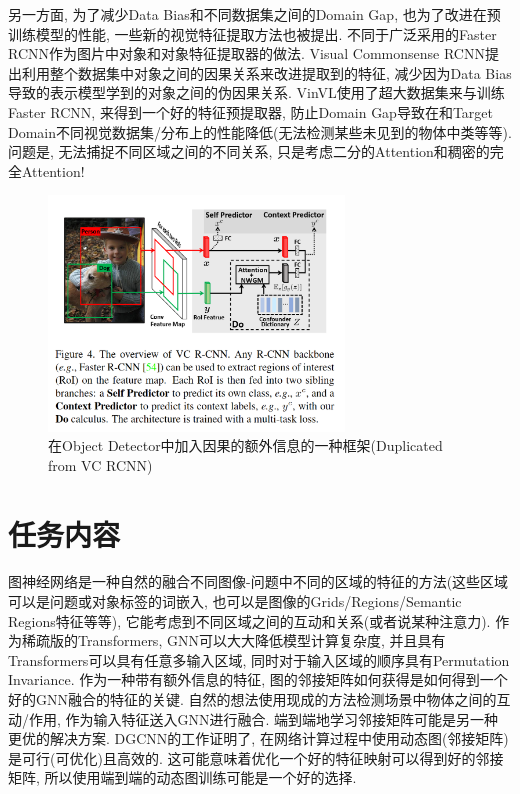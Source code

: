 \documentclass{article}
\begin{document}
另一方面, 为了减少Data Bias和不同数据集之间的Domain Gap, 也为了改进在预训练模型的性能, 一些新的视觉特征提取方法也被提出. 不同于广泛采用的Faster RCNN作为图片中对象和对象特征提取器的做法. Visual Commonsense RCNN提出利用整个数据集中对象之间的因果关系来改进提取到的特征, 减少因为Data Bias导致的表示模型学到的对象之间的伪因果关系. VinVL使用了超大数据集来与训练Faster RCNN, 来得到一个好的特征预提取器, 防止Domain Gap导致在和Target Domain不同视觉数据集/分布上的性能降低(无法检测某些未见到的物体中类等等). 问题是, 无法捕捉不同区域之间的不同关系, 只是考虑二分的Attention和稠密的完全Attention!

\begin{figure}[htbp]
    \caption{在Object Detector中加入因果的额外信息的一种框架(Duplicated from VC RCNN)}
    \centering
    \includegraphics[width=0.7\textwidth]{vcrcnn-arch.PNG}
\end{figure}


\section{任务内容}

图神经网络是一种自然的融合不同图像-问题中不同的区域的特征的方法(这些区域可以是问题或对象标签的词嵌入, 也可以是图像的Grids/Regions/Semantic Regions特征等等), 它能考虑到不同区域之间的互动和关系(或者说某种注意力). 作为稀疏版的Transformers, GNN可以大大降低模型计算复杂度, 并且具有Transformers可以具有任意多输入区域, 同时对于输入区域的顺序具有Permutation Invariance. 作为一种带有额外信息的特征, 图的邻接矩阵如何获得是如何得到一个好的GNN融合的特征的关键. 自然的想法使用现成的方法检测场景中物体之间的互动/作用, 作为输入特征送入GNN进行融合. 端到端地学习邻接矩阵可能是另一种更优的解决方案. DGCNN的工作证明了, 在网络计算过程中使用动态图(邻接矩阵)是可行(可优化)且高效的. 这可能意味着优化一个好的特征映射可以得到好的邻接矩阵, 所以使用端到端的动态图训练可能是一个好的选择.
\end{document}
